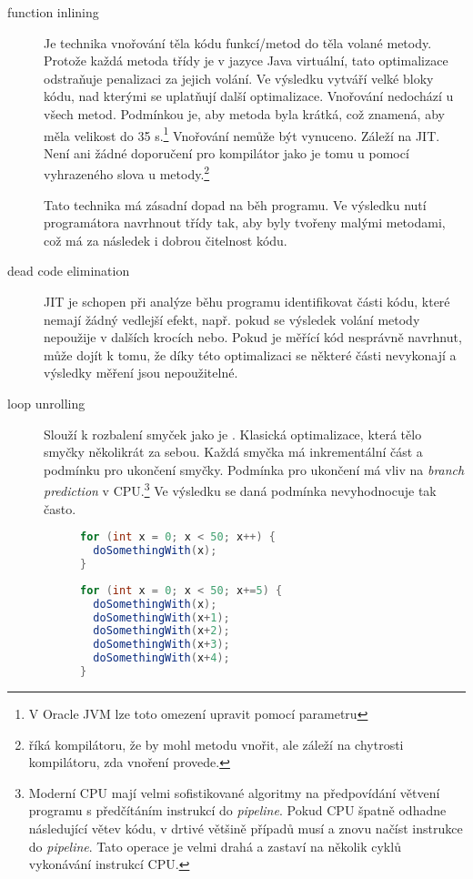 \begin{description}
\item[function inlining] Je technika vnořování těla kódu funkcí/metod do těla volané metody. Protože každá metoda třídy je v jazyce Java virtuální, tato optimalizace odstraňuje penalizaci za jejich volání. Ve výsledku vytváří velké bloky kódu, nad kterými se uplatňují další optimalizace. Vnořování nedochází u všech metod. Podmínkou je, aby metoda byla krátká, což znamená, aby měla velikost do 35 \bytecode s.\footnote{V Oracle JVM lze toto omezení upravit pomocí parametru } Vnořování nemůže být vynuceno. Záleží na JIT. Není ani žádné doporučení pro kompilátor jako je tomu u \CC{} pomocí vyhrazeného slova  u metody.\footnote{ říká kompilátoru, že by mohl metodu vnořit, ale záleží na chytrosti kompilátoru, zda vnoření provede\cite{Stroustrup:1997:CPL:523265}.}

Tato technika má zásadní dopad na běh programu. Ve výsledku nutí programátora navrhnout třídy tak, aby byly tvořeny malými metodami, což má za následek i dobrou čitelnost kódu.

\item[dead code elimination] JIT je schopen při analýze běhu programu identifikovat části kódu, které nemají žádný vedlejší efekt, např. pokud se výsledek volání metody nepoužije v dalších krocích nebo. Pokud je měřící kód nesprávně navrhnut, může dojít k tomu, že díky této optimalizaci se některé části nevykonají a výsledky měření jsou nepoužitelné.

\item[loop unrolling] Slouží k rozbalení smyček jako je . Klasická optimalizace, která tělo smyčky  několikrát za sebou. Každá smyčka má inkrementální část a podmínku pro ukončení smyčky. Podmínka pro ukončení má vliv na \emph{branch prediction} v CPU.\footnote{Moderní CPU mají velmi sofistikované algoritmy na předpovídání větvení programu s předčítáním instrukcí do \emph{pipeline}. Pokud CPU špatně odhadne následující větev kódu, v drtivé většině případů musí  a znovu načíst instrukce do \emph{pipeline}. Tato operace je velmi drahá a zastaví na několik cyklů vykonávání instrukcí CPU.} Ve výsledku se daná podmínka nevyhodnocuje tak často.

\begin{figure}
\begin{lstlisting}[frame=single,language=Java,caption=Před loop unrolling]
for (int x = 0; x < 50; x++) {
  doSomethingWith(x);
}
\end{lstlisting}
\begin{lstlisting}[frame=single,language=Java,caption=Po loop unrolling]
for (int x = 0; x < 50; x+=5) {
  doSomethingWith(x);
  doSomethingWith(x+1);
  doSomethingWith(x+2);
  doSomethingWith(x+3);
  doSomethingWith(x+4);
}
\end{lstlisting}
\end{figure}
\end{description}

